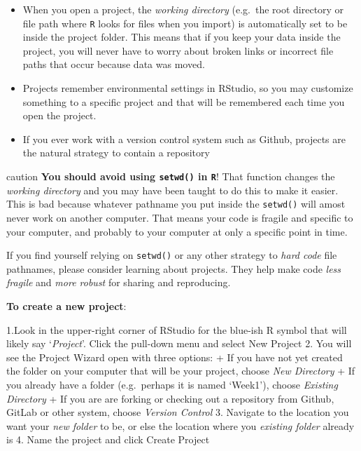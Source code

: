 \documentclass[
]{book}
\providecommand{\tightlist}{%
  \setlength{\itemsep}{0pt}\setlength{\parskip}{0pt}}
\begin{document}
\begin{itemize}
\tightlist
\item
  When you open a project, the \emph{working directory} (e.g.~the root directory or file path where \texttt{R} looks for files when you import) is automatically set to be inside the project folder. This means that if you keep your data inside the project, you will never have to worry about broken links or incorrect file paths that occur because data was moved.
\item
  Projects remember environmental settings in RStudio, so you may customize something to a specific project and that will be remembered each time you open the project.
\item
  If you ever work with a version control system such as Github, projects are the natural strategy to contain a repository
\end{itemize}

\begin{rmd-caution}{caution}
\textbf{You should avoid using \texttt{setwd()} in \texttt{R}}! That function changes the \emph{working directory} and you may have been taught to do this to make it easier. This is bad because whatever pathname you put inside the \texttt{setwd()} will amost never work on another computer. That means your code is fragile and specific to your computer, and probably to your computer at only a specific point in time.

If you find yourself relying on \texttt{setwd()} or any other strategy to \emph{hard code} file pathnames, please consider learning about projects. They help make code \emph{less fragile} and \emph{more robust} for sharing and reproducing.

\end{rmd-caution}

\textbf{To create a new project}:

1.Look in the upper-right corner of RStudio for the blue-ish R symbol that will likely say `\emph{Project}'. Click the pull-down menu and select New Project
2. You will see the Project Wizard open with three options:
+ If you have not yet created the folder on your computer that will be your project, choose \emph{New Directory}
+ If you already have a folder (e.g.~perhaps it is named `Week1'), choose \emph{Existing Directory}
+ If you are are forking or checking out a repository from Github, GitLab or other system, choose \emph{Version Control}
3. Navigate to the location you want your \emph{new folder} to be, or else the location where you \emph{existing folder} already is
4. Name the project and click Create Project
\end{document}

